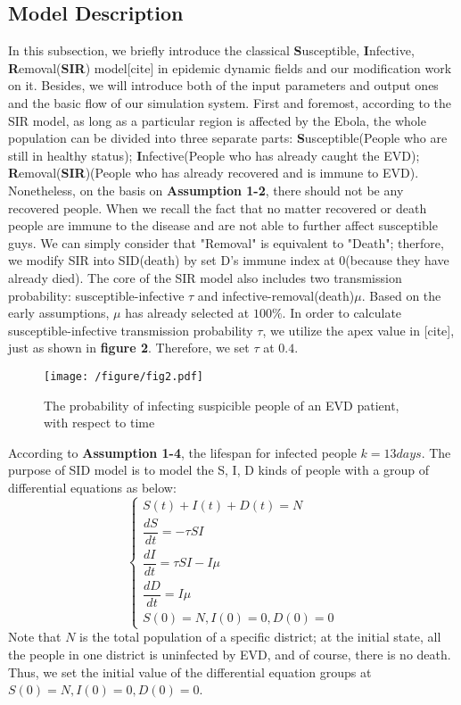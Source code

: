 \subsection{Model Description}
In this subsection, we briefly introduce the classical \textbf{S}usceptible, \textbf{I}nfective, \textbf{R}emoval(\textbf{SIR}) model[cite] in epidemic dynamic fields and our modification work on it. Besides, we will introduce both of the input parameters and output ones and the basic flow of our simulation system.
First and foremost, according to the SIR model, as long as a particular region is affected by the Ebola, the whole population can be divided into three separate parts: \textbf{S}usceptible(People who are still in healthy status); \textbf{I}nfective(People who has already caught the EVD); \textbf{R}emoval(\textbf{SIR})(People who has already recovered and is immune to EVD). Nonetheless, on the basis on \textbf{Assumption 1-2}, there should not be any recovered people. When we recall the fact that no matter recovered or death people are immune to the disease and are not able to further affect susceptible guys. We can simply consider that "Removal" is equivalent to "Death"; therfore, we modify SIR into SID(death) by set D's immune index at 0(because they have already died). The core of the SIR model also includes two transmission probability: susceptible-infective $\tau$ and infective-removal(death)$\mu$. Based on the early assumptions, $\mu$ has already selected at $100\%$. In order to calculate susceptible-infective transmission probability $\tau$, we utilize the apex value in [cite], just as shown in \textbf{figure 2}. Therefore, we set $\tau$ at $0.4$. 
\begin{figure}[htbp]
\centering
\texttt{[image: /figure/fig2.pdf]}
\caption{The probability of infecting suspicible people of an EVD patient, with respect to time}\label{fig:2}
\end{figure}
According to \textbf{Assumption 1-4}, the lifespan for infected people $k=13 days$. The purpose of SID model is to model the S, I, D kinds of people with a group of differential equations as below:
\begin{equation}
 \left\{
\begin{aligned}
S\left( t\right) +I\left( t\right) +D\left( t\right) =N \\
\dfrac {dS}{dt}=-\tau SI \\
\dfrac {dI}{dt}=\tau SI-I\mu \\
\dfrac {dD}{dt}=I\mu \\
S(0)=N, I(0)=0, D(0)=0
\end{aligned}
\right.
\end{equation}
Note that $N$ is the total population of a specific district; at the initial state, all the people in one district is uninfected by EVD, and of course, there is no death. Thus, we set the initial value of the differential equation groups at $S(0)=N, I(0)=0, D(0)=0$.

